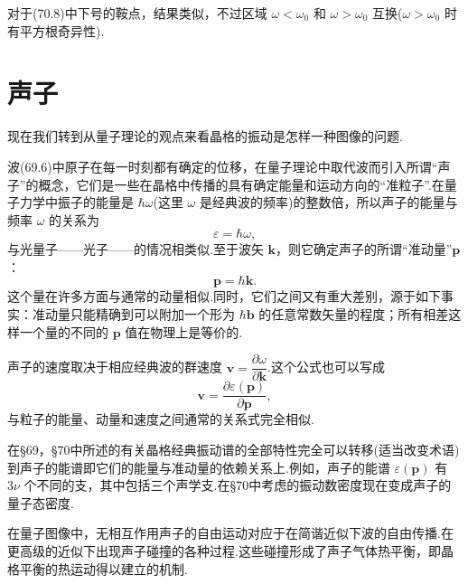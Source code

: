 对于(70.8)中下号的鞍点，结果类似，不过区域 $\omega<\omega_0$ 和 $\omega>\omega_0$ 互换($\omega>\omega_0$ 时有平方根奇异性).

\section{声子}

现在我们转到从量子理论的观点来看晶格的振动是怎样一种图像的问题.

波(69.6)中原子在每一时刻都有确定的位移，在量子理论中取代波而引入所谓“声子”的概念，它们是一些在晶格中传播的具有确定能量和运动方向的“准粒子”.在量子力学中振子的能量是 $\hbar\omega$(这里 $\omega$ 是经典波的频率)的整数倍，所以声子的能量与频率 $\omega$ 的关系为
\begin{equation}
  \varepsilon=\hbar\omega,
\end{equation}
与光量子——光子——的情况相类似.至于波矢 $\boldsymbol{k}$，则它确定声子的所谓“准动量”$\boldsymbol{p}$：
\begin{equation}
  \boldsymbol{p}=\hbar\boldsymbol{k}.
\end{equation}
这个量在许多方面与通常的动量相似.同时，它们之间又有重大差别，源于如下事实：准动量只能精确到可以附加一个形为 $\hbar\boldsymbol{b}$ 的任意常数矢量的程度；所有相差这样一个量的不同的 $\boldsymbol{p}$ 值在物理上是等价的.

声子的速度取决于相应经典波的群速度 $\boldsymbol{v}=\dfrac{\partial\omega}{\partial\boldsymbol{k}}$.这个公式也可以写成
\begin{equation}
  \boldsymbol{v}=\frac{\partial\varepsilon(\boldsymbol{p})}{\partial\boldsymbol{p}},
\end{equation}
与粒子的能量、动量和速度之间通常的关系式完全相似.

在§69，§70中所述的有关晶格经典振动谱的全部特性完全可以转移(适当改变术语)到声子的能谱即它们的能量与准动量的依赖关系上.例如，声子的能谱 $\varepsilon(\boldsymbol{p})$ 有 $3\nu$ 个不同的支，其中包括三个声学支.在§70中考虑的振动数密度现在变成声子的量子态密度.

在量子图像中，无相互作用声子的自由运动对应于在简谐近似下波的自由传播.在更高级的近似下出现声子碰撞的各种过程.这些碰撞形成了声子气体热平衡，即晶格平衡的热运动得以建立的机制.


